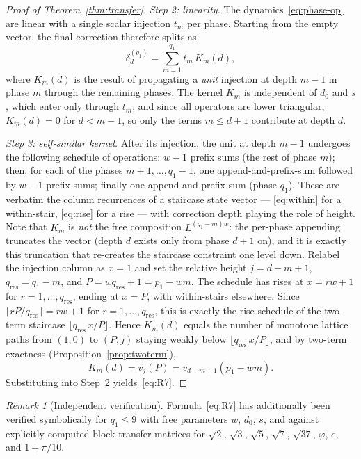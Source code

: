 \documentclass[11pt]{article}
\theoremstyle{definition}
\theoremstyle{remark}
\newtheorem{remark}[theorem]{Remark}
\newcommand{\floor}[1]{\lfloor #1 \rfloor}
\begin{document}
\begin{proof}[Proof of Theorem~\ref{thm:transfer}]
\emph{Step 2: linearity.}
The dynamics~\eqref{eq:phase-op} are linear with a single scalar
injection $t_m$ per phase.
Starting from the empty vector, the final correction therefore
splits as
\[
  \delta_d^{(q_1)} = \sum_{m=1}^{q_1} t_m\, K_m(d),
\]
where $K_m(d)$ is the result of propagating a \emph{unit}
injection at depth $m - 1$ in phase $m$ through the remaining
phases.
The kernel $K_m$ is independent of $d_0$ and $s$, which enter
only through $t_m$; and since all operators are lower triangular,
$K_m(d) = 0$ for $d < m - 1$, so only the terms $m \leq d + 1$
contribute at depth $d$.

\emph{Step 3: self-similar kernel.}
After its injection, the unit at depth $m - 1$ undergoes the
following schedule of operations: $w - 1$ prefix sums (the rest of
phase $m$); then, for each of the phases $m + 1, \ldots, q_1 - 1$,
one append-and-prefix-sum followed by $w - 1$ prefix sums; finally
one append-and-prefix-sum (phase $q_1$).
These are verbatim the column recurrences of a staircase state
vector --- \eqref{eq:within} for a within-stair,
\eqref{eq:rise} for a rise --- with correction depth playing the
role of height.
Note that $K_m$ is \emph{not} the free composition
$L^{(q_1-m)w}$: the per-phase appending truncates the vector
(depth $d$ exists only from phase $d + 1$ on), and it is exactly
this truncation that re-creates the staircase constraint one
level down.
Relabel the injection column as $x = 1$ and set the relative
height $j = d - m + 1$, $q_{\mathrm{res}} = q_1 - m$, and
$P = w q_{\mathrm{res}} + 1 = p_1 - wm$.
The schedule has rises at $x = rw + 1$ for
$r = 1, \ldots, q_{\mathrm{res}}$, ending at $x = P$, with
within-stairs elsewhere.
Since $\lceil r P / q_{\mathrm{res}} \rceil = rw + 1$ for
$r = 1, \ldots, q_{\mathrm{res}}$, this is exactly the rise
schedule of the two-term staircase
$\floor{q_{\mathrm{res}}\, x / P}$.
Hence $K_m(d)$ equals the number of monotone lattice paths from
$(1, 0)$ to $(P, j)$ staying weakly below
$\floor{q_{\mathrm{res}}\, x / P}$, and by two-term exactness
(Proposition~\ref{prop:twoterm}),
\[
  K_m(d) = v_j(P) = v_{d-m+1}(p_1 - wm).
\]
Substituting into Step~2 yields~\eqref{eq:R7}.
\end{proof}

\begin{remark}[Independent verification]
Formula~\eqref{eq:R7} has additionally been verified symbolically
for $q_1 \leq 9$ with free parameters $w$, $d_0$, $s$, and against
explicitly computed block transfer matrices for
$\sqrt{2}$, $\sqrt{3}$, $\sqrt{5}$, $\sqrt{7}$, $\sqrt{37}$,
$\varphi$, $e$, and $1 + \pi/10$.
\end{remark}
\end{document}
